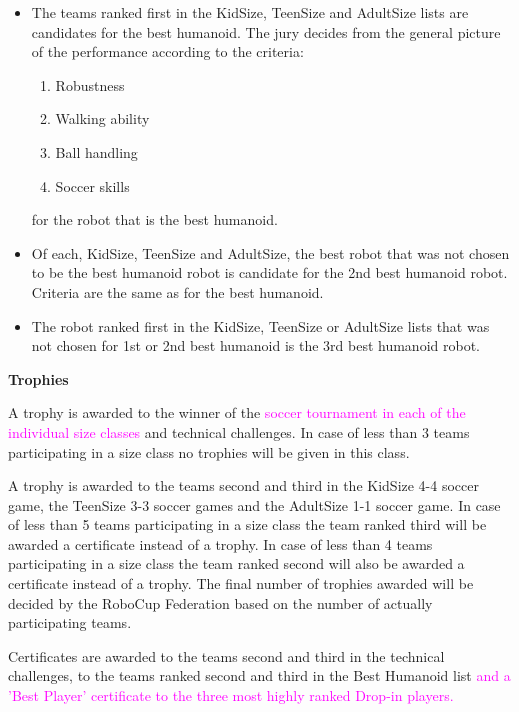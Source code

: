 \begin{itemize}
\item The teams ranked first in the KidSize, TeenSize and AdultSize lists are candidates for the best humanoid. The jury decides from the general picture of the performance according to the criteria:
\begin{enumerate}
\item Robustness
\item Walking ability
\item Ball handling
\item Soccer skills
\end{enumerate}
for the robot that is the best humanoid.
\item Of each, KidSize, TeenSize and AdultSize, the best robot that was not chosen to be the best humanoid robot is candidate for the 2nd best humanoid robot. Criteria are the same as for the best humanoid.
\item The robot ranked first in the KidSize, TeenSize or AdultSize lists that was not chosen for 1st or 2nd best humanoid is the 3rd best humanoid robot.
\end{itemize}

\bigskip

{\bfseries Trophies}

\headlinebox

A trophy is awarded to the winner of the \textcolor{magenta}{soccer tournament in each of the individual size classes} and technical challenges. In case of less than 3 teams participating in a size class no trophies will be given in this class.

\bigskip

A trophy is awarded to the teams second and third in the KidSize 4-4 soccer game, the TeenSize 3-3 soccer games and the AdultSize 1-1 soccer game. In case of less than 5 teams participating in a size class the team ranked third will be awarded a certificate instead of a trophy. In case of less than 4 teams participating in a size class the team ranked second will also be awarded a certificate instead of a trophy. The final number of trophies awarded will be decided by the RoboCup Federation based on the number of actually participating teams.

\bigskip

Certificates are awarded to the teams second and third in the technical challenges, to the teams ranked second and third in the Best Humanoid list \textcolor{magenta}{and a 'Best Player' certificate to the three most highly ranked Drop-in players.}

